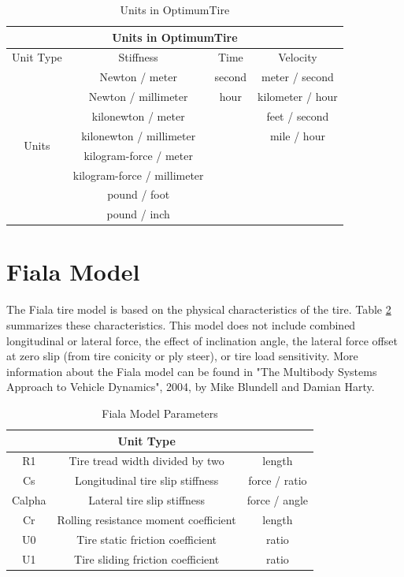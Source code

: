 \begin{table}[h]
	\centering
			\begin{tabular}{|c|c|c|c|}
			\hline
			\multicolumn{4}{|c|}{\cellcolor{tblue}\textbf{Units in OptimumTire}} \\ \hline
			\rowcolor{ttblue}Unit Type	&Stiffness	&Time& Velocity \\ \hline
			\multirow{8}{*}{Units}&Newton / meter	&second	&meter / second \\ \cline{2-4}
			&Newton / millimeter	&hour	&kilometer / hour\\ \cline{2-4}
			&kilonewton / meter	&&	feet / second\\ \cline{2-4}
			&kilonewton / millimeter	&&	mile / hour\\ \cline{2-4}
			&kilogram-force / meter		&&\\ \cline{2-4}
			&kilogram-force / millimeter	&&	\\ \cline{2-4}
			&pound / foot		&&\\ \cline{2-4}
			&pound / inch		&&\\ \hline

		\end{tabular}
	\caption{Units in OptimumTire}
	\label{tbl:UnitsInOptimumT}
\end{table}

\section{Fiala Model}
\label{sec:Fiala}
The Fiala tire model is based on the physical characteristics of the tire. Table \ref{tbl:FialaModelParameters} summarizes these characteristics. This model does not include combined longitudinal or lateral force, the effect of inclination angle, the lateral force offset at zero slip (from tire conicity or ply steer), or tire load sensitivity. More information about the Fiala model can be found in "The Multibody Systems Approach to Vehicle Dynamics", 2004, by Mike Blundell and Damian Harty.

\begin{table}[H]
	\centering
			\begin{tabular}{|c|c|c|}
			\hline
			\rowcolor{tblue}\multicolumn{2}{|c|}{\cellcolor{tblue}\textbf{Fiala Model Parameters}}&Unit Type \\ \hline
			R1 &	Tire tread width divided by two	&length \\ \hline
			Cs&	Longitudinal tire slip stiffness 	&force / ratio \\ \hline
			Calpha&	Lateral tire slip stiffness 	&force / angle \\ \hline
			Cr&	Rolling resistance moment coefficient 	&length \\ \hline
			U0&	Tire static friction coefficient	&ratio \\ \hline
			U1&	Tire sliding friction coefficient	&ratio \\ \hline
			\end{tabular}
	\caption{Fiala Model Parameters}
	\label{tbl:FialaModelParameters}
\end{table}

